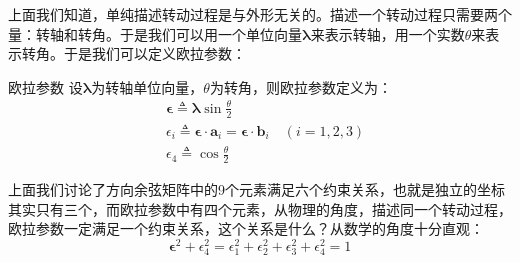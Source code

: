 上面我们知道，单纯描述转动过程是与外形无关的。描述一个转动过程只需要两个量：转轴和转角。于是我们可以用一个单位向量$\bm{\lambda}$来表示转轴，用一个实数$\theta$来表示转角。于是我们可以定义欧拉参数：
\begin{mydefinition}{欧拉参数}
    设$\bm{\lambda}$为转轴单位向量，$\theta$为转角，则欧拉参数定义为：
    \begin{equation}
        \label{eq:欧拉参数定义}
        \begin{aligned}
            &\bm{\epsilon} \triangleq \bm{\lambda}\sin \frac{\theta}{2}\\
            &\epsilon_i \triangleq \bm{\epsilon} \cdot \bm{a}_i=\bm{\epsilon} \cdot \bm{b}_i\quad(i=1,2,3)\\
            &\epsilon_4 \triangleq \cos \frac{\theta}{2}
        \end{aligned}
    \end{equation}

\end{mydefinition}



上面我们讨论了方向余弦矩阵中的9个元素满足六个约束关系，也就是独立的坐标其实只有三个，而欧拉参数中有四个元素，从物理的角度，描述同一个转动过程，欧拉参数一定满足一个约束关系，这个关系是什么？从数学的角度十分直观：
\begin{equation}\label{eq:欧拉参数归一化}
    \bm{\epsilon}^2+\epsilon_4^2=\epsilon_1^2+\epsilon_2^2+\epsilon_3^2+\epsilon_4^2=1
\end{equation}


